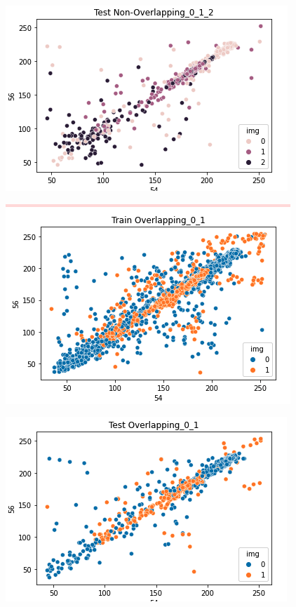 \documentclass[12pt]{article}
\begin{document}
\begin{multicols*}{2}
\begin{center}
		\includegraphics[scale=0.3]{../screenshot/test_scatter_nonover_012.png}

		\includegraphics[scale=0.3]{../screenshot/train_scatter_over_01.png}

		\includegraphics[scale=0.3]{../screenshot/test_scatter_01.png}


\end{center}
\end{multicols*}
\end{document}
